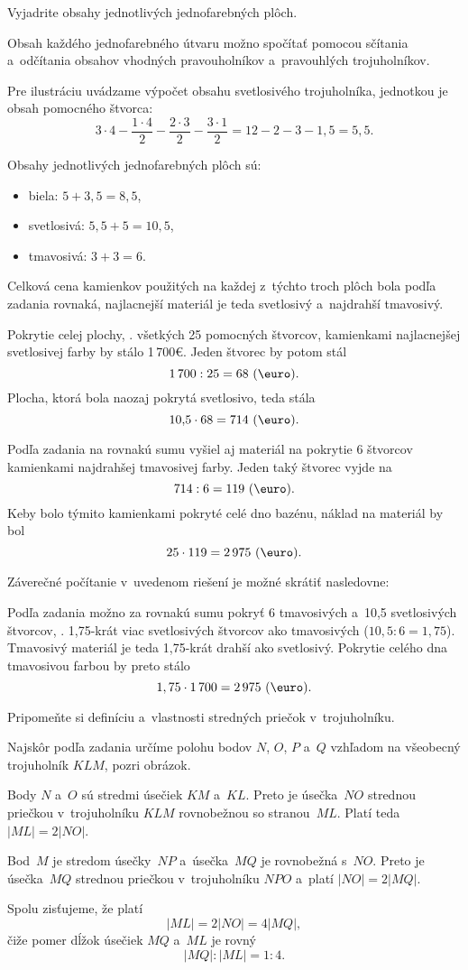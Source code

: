 {%
\napad
Vyjadrite obsahy jednotlivých jednofarebných plôch.

\riesenie
Obsah každého jednofarebného útvaru možno spočítať pomocou sčítania a~odčítania
obsahov vhodných pravouholníkov a~pravouhlých trojuholníkov.
%

Pre ilustráciu uvádzame výpočet obsahu svetlosivého trojuholníka, jednotkou je obsah pomocného štvorca:
$$
3\cdot4-\frac{1\cdot4}2-\frac{2\cdot3}2-\frac{3\cdot1}2
=12-2-3-1{,}5=5{,}5.
$$

\noindent
Obsahy jednotlivých jednofarebných plôch sú:
\begin{itemize}
\item biela: $5+3{,}5=8{,}5$,
\item svetlosivá: $5{,}5+5=10{,}5$,
\item tmavosivá: $3+3=6$.
\end{itemize}
Celková cena kamienkov použitých na každej z~týchto troch plôch bola podľa zadania
rovnaká, najlacnejší materiál je teda svetlosivý a~najdrahší tmavosivý.

Pokrytie celej plochy, \tj. všetkých 25 pomocných štvorcov, kamienkami najlacnejšej svetlosivej
farby by stálo 1\,700€.
Jeden štvorec by potom stál
$$
1\,700:25=68\ (\text\euro).
$$
Plocha, ktorá bola naozaj pokrytá svetlosivo, teda stála
$$
10{,}5\cdot68=714\ (\text\euro).
$$

Podľa zadania na rovnakú sumu vyšiel aj materiál na pokrytie 6 štvorcov
kamienkami najdrahšej tmavosivej farby.
Jeden taký štvorec vyjde na
$$
714:6=119\ (\text\euro).
$$
Keby bolo týmito kamienkami pokryté celé dno bazénu, náklad na materiál by bol
$$
25\cdot119=2\,975\ (\text\euro).
$$

\poznamka
Záverečné počítanie v~uvedenom riešení je možné skrátiť nasledovne:

Podľa zadania možno za rovnakú sumu pokryť 6 tmavosivých a~10{,}5 svetlosivých
štvorcov, \tj. 1{,}75-krát viac svetlosivých štvorcov ako tmavosivých
($10{,}5:6=1{,}75$).
Tmavosivý materiál je teda 1{,}75-krát drahší ako svetlosivý.
Pokrytie celého dna tmavosivou farbou by preto stálo
$$
1,75\cdot1\,700=2\,975\ (\text\euro).
$$
}

{%
\napad
Pripomeňte si definíciu a~vlastnosti stredných priečok v~trojuholníku.

\riesenie
Najskôr podľa zadania určíme polohu bodov $N$, $O$, $P$ a~$Q$ vzhľadom na všeobecný trojuholník $KLM$, pozri obrázok.
%

Body $N$ a~$O$ sú stredmi úsečiek $KM$ a~$KL$.
Preto je úsečka~$NO$ strednou priečkou v~trojuholníku $KLM$ rovnobežnou so stranou~$ML$.
Platí teda $|ML|=2|NO|$.

Bod~$M$ je stredom úsečky~$NP$ a~úsečka~$MQ$ je rovnobežná s~$NO$.
Preto je úsečka~$MQ$ strednou priečkou v~trojuholníku $NPO$ a~platí
$|NO|=2|MQ|$.

Spolu zisťujeme, že platí
$$
|ML|=2|NO|=4|MQ|,
$$
čiže pomer dĺžok úsečiek $MQ$ a~$ML$ je rovný
$$
|MQ|:|ML|=1:4.
$$
}

